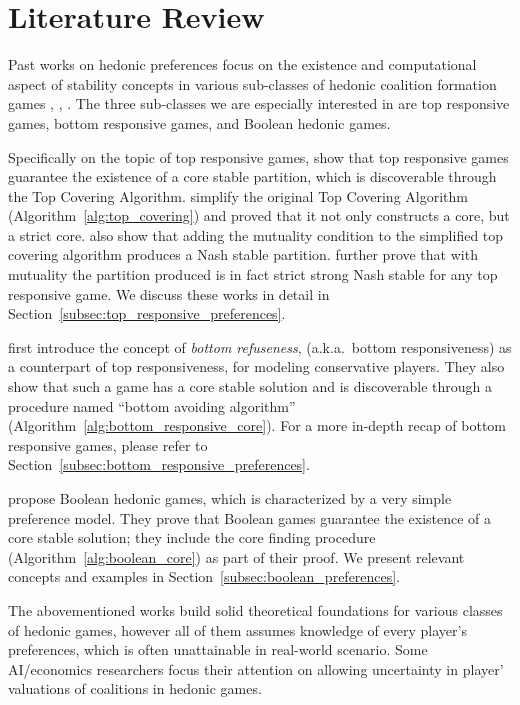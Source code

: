 \chapter{Literature Review}
\label{ch:review}

Past works on hedonic preferences focus on the existence and computational
aspect of stability concepts in various sub-classes of hedonic coalition
formation games
\cite{Aziz:2012:ESH:2343776.2343806}, \cite{aziz_savani_moulin_2016},
\cite{Aziz:2016:BHG:3032027.3032048}.
The three sub-classes we are especially interested in are top responsive games,
bottom responsive games, and Boolean hedonic games.

Specifically on the topic of top responsive games,
 show that top responsive games guarantee the
existence of a core stable partition, which is discoverable through the Top
Covering Algorithm.
 simplify the original Top Covering Algorithm
(Algorithm~\ref{alg:top_covering}) and proved that it not only constructs a
core, but a strict core.
 also show that adding the mutuality condition
to the simplified top covering algorithm produces a Nash stable partition.
 further prove that with mutuality
the partition produced is in fact strict strong Nash stable for any top
responsive game.
We discuss these works in detail in
Section~\ref{subsec:top_responsive_preferences}.

 first introduce the concept of \textit{bottom refuseness},
(a.k.a.\ bottom responsiveness) as a counterpart of top responsiveness, for
modeling conservative players.
They also show that such a game has a core stable solution and is discoverable
through a procedure named ``bottom avoiding algorithm''
(Algorithm~\ref{alg:bottom_responsive_core}).
For a more in-depth recap of bottom responsive games, please refer to
Section~\ref{subsec:bottom_responsive_preferences}.

 propose Boolean hedonic games,
which is characterized by a very simple preference model.
They prove that Boolean games guarantee the existence of a core stable solution;
they include the core finding procedure (Algorithm~\ref{alg:boolean_core}) as
part of their proof.
We present relevant concepts and examples in
Section~\ref{subsec:boolean_preferences}.

The abovementioned works build solid theoretical foundations for various
classes of hedonic games, however all of them assumes knowledge of every
player's preferences, which is often unattainable in real-world scenario.
Some AI/economics researchers focus their attention on allowing uncertainty in
player' valuations of coalitions in hedonic games.

